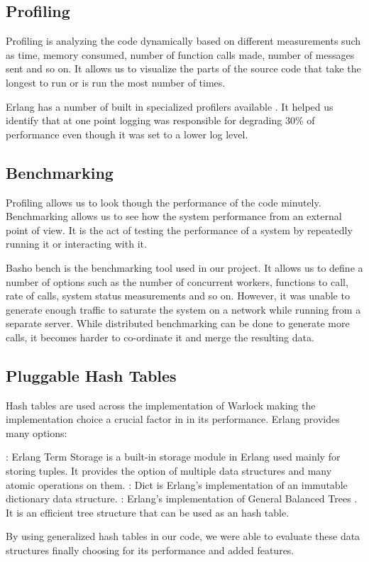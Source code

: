 \subsection{Profiling}
\label{section:impl.profiling}

Profiling is analyzing the code dynamically based on different measurements such
as  time, memory consumed, number of function calls made, number of
messages
sent and so on. It allows us to visualize the parts of the source code that take
the longest to run or is run the most number of times.

Erlang has a number of built in specialized profilers available
\citep{erlang.profiling}. It helped us identify that at one point logging was
responsible for degrading 30\% of performance even though it was set to a
lower log level.

\subsection{Benchmarking}

Profiling allows us to look though the performance of the code minutely.
Benchmarking allows us to see how the system performance from an external
point of view. It is the act of testing the performance of a system by
repeatedly running it or interacting with it.

Basho bench \citep{basho.bench} is the benchmarking tool used in our project.
It allows us to define a number of options such as the number of concurrent
workers, functions to call, rate of calls, system status measurements and so
on. However, it was unable to generate enough traffic to saturate the system
on a network while running from a separate server. While distributed
benchmarking can be done to generate more calls, it becomes harder to
co-ordinate it and merge the resulting data.

\subsection{Pluggable Hash Tables}

Hash tables are used across the implementation of Warlock making the
implementation choice a crucial factor in in its performance. Erlang provides
many options:

\begin{itemize}
    : Erlang Term Storage is a built-in storage module in Erlang
    used mainly for storing tuples. It provides the option of multiple data
    structures and many atomic operations on them.
    : Dict is Erlang's implementation of an immutable dictionary
    data structure.
    : Erlang's implementation of General Balanced Trees
    \citep{Andersson99}. It is an efficient tree structure that can be used
    as an hash table.
\end{itemize}

By using generalized hash tables in our code, we were able to evaluate these
data structures finally choosing  for its performance and added
features.

